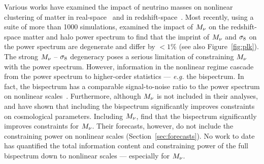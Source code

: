 Various works have examined the impact of neutrino masses on nonlinear clustering 
of matter in 
real-space~\citep[\emph{e.g.}][]{brandbyge2008, saito2008, wong2008, saito2009, viel2010, agarwal2011, bird2012, castorina2015, banerjee2016} 
and in redshift-space~\citep{marulli2011, castorina2015, upadhye2016}. Most recently, 
using a suite of more than 1000 simulations, \cite{villaescusa-navarro2018} 
examined the impact of $M_\nu$ on the redshift-space matter and halo power 
spectrum to find that the imprint of $M_\nu$ and $\sigma_8$ on the power spectrum are 
degenerate and differ by $< 1\%$ (see also Figure~\ref{fig:plk}). The strong $M_\nu$ -- $\sigma_8$ degeneracy
poses a serious limitation of constraining $M_\nu$ with the power spectrum. 
However, information in the nonlinear regime cascade from the power spectrum 
to higher-order statistics --- \emph{e.g.} the bispectrum. In fact, the 
bispectrum has a comparable signal-to-noise ratio to the power spectrum
on nonlinear scales~\citep{sefusatti2005, chan2017}. Furthermore, although $M_\nu$ 
is not included in their analyses, \cite{sefusatti2006} and \cite{yankelevich2019} 
have shown that including the bispectrum significantly improves constraints on 
cosmological parameters. %
Including $M_\nu$, \cite{chudaykin2019} find that the bispectrum significantly 
improves constraints for $M_\nu$. Their forecasts, however, do not include the 
constraining power on nonlinear scales (Section~\ref{sec:forecasts}). 
No work to date has quantified the total information content and constraining 
power of the full bispectrum down to nonlinear scales --- especially for $M_\nu$. 

